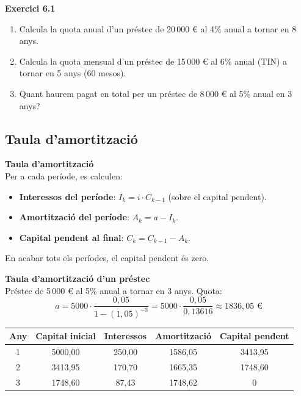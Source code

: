 \documentclass[12pt]{article}
\begin{document}
\begin{exercici}
\textbf{Exercici 6.1}\\
\begin{enumerate}[label=\alph*)]
    \item Calcula la quota anual d'un préstec de 20\,000 € al 4\% anual a tornar en 8 anys.
    \item Calcula la quota mensual d'un préstec de 15\,000 € al 6\% anual (TIN) a tornar en 5 anys (60 mesos).
    \item Quant haurem pagat en total per un préstec de 8\,000 € al 5\% anual en 3 anys?
\end{enumerate}
\end{exercici}

\subsection{Taula d'amortització}

\begin{concept}
\textbf{Taula d'amortització}\\
Per a cada període, es calculen:
\begin{itemize}
    \item \textbf{Interessos del període}: $I_k = i \cdot C_{k-1}$ (sobre el capital pendent).
    \item \textbf{Amortització del període}: $A_k = a - I_k$.
    \item \textbf{Capital pendent al final}: $C_k = C_{k-1} - A_k$.
\end{itemize}
En acabar tots els períodes, el capital pendent és zero.
\end{concept}

\begin{exemple}
\textbf{Taula d'amortització d'un préstec}\\
Préstec de 5\,000 € al 5\% anual a tornar en 3 anys. Quota:
\[
a = 5000 \cdot \dfrac{0{,}05}{1 - (1{,}05)^{-3}} = 5000 \cdot \dfrac{0{,}05}{0{,}13616} \approx 1836{,}05 \text{ €}
\]

\begin{center}
\small
\begin{tabular}{|c|c|c|c|c|}
\hline
\textbf{Any} & \textbf{Capital inicial} & \textbf{Interessos} & \textbf{Amortització} & \textbf{Capital pendent} \\ \hline
1 & 5000{,}00 & 250{,}00 & 1586{,}05 & 3413{,}95 \\ \hline
2 & 3413{,}95 & 170{,}70 & 1665{,}35 & 1748{,}60 \\ \hline
3 & 1748{,}60 & 87{,}43 & 1748{,}62 & 0 \\ \hline
\end{tabular}
\end{center}
\end{exemple}
\end{document}
